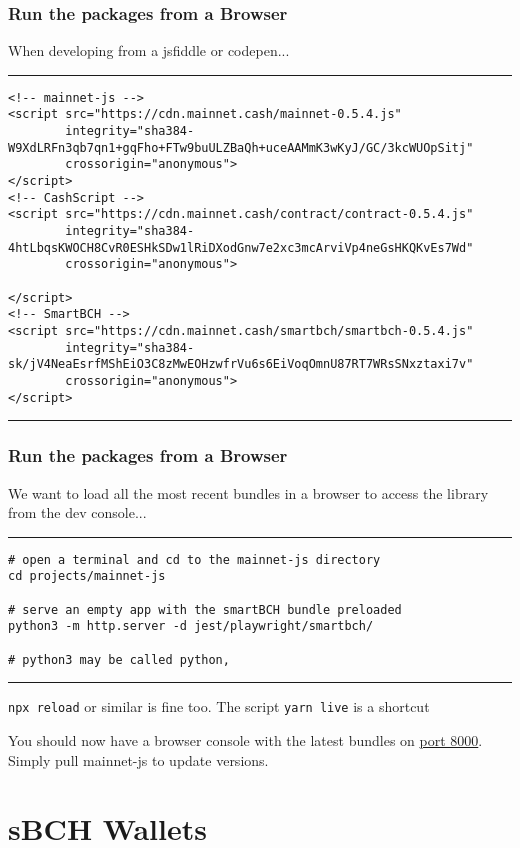\documentclass{beamer}
\begin{document}
\begin{frame}[fragile]
    \frametitle{Run the packages from a Browser}
    When developing from a jsfiddle or codepen...
    \rule{\textwidth}{0.4pt}
    \tiny
    \begin{verbatim}
<!-- mainnet-js -->
<script src="https://cdn.mainnet.cash/mainnet-0.5.4.js"
        integrity="sha384-W9XdLRFn3qb7qn1+gqFho+FTw9buULZBaQh+uceAAMmK3wKyJ/GC/3kcWUOpSitj"
        crossorigin="anonymous">
</script>
<!-- CashScript -->
<script src="https://cdn.mainnet.cash/contract/contract-0.5.4.js"
        integrity="sha384-4htLbqsKWOCH8CvR0ESHkSDw1lRiDXodGnw7e2xc3mcArviVp4neGsHKQKvEs7Wd"
        crossorigin="anonymous">

</script>
<!-- SmartBCH -->
<script src="https://cdn.mainnet.cash/smartbch/smartbch-0.5.4.js"
        integrity="sha384-sk/jV4NeaEsrfMShEiO3C8zMwEOHzwfrVu6s6EiVoqOmnU87RT7WRsSNxztaxi7v"
        crossorigin="anonymous">
</script>
    \end{verbatim}
\rule{\textwidth}{0.4pt}
\end{frame}


\begin{frame}[fragile]
    \frametitle{Run the packages from a Browser}
We want to load all the most recent bundles in a browser to access the library from the dev console...
    \rule{\textwidth}{0.4pt}
    \tiny
    \begin{verbatim}
# open a terminal and cd to the mainnet-js directory
cd projects/mainnet-js

# serve an empty app with the smartBCH bundle preloaded
python3 -m http.server -d jest/playwright/smartbch/

# python3 may be called python, 

    \end{verbatim}
\rule{\textwidth}{0.4pt}

\texttt{npx reload} or similar is fine too. The script \texttt{yarn live}  is a shortcut

You should now have a browser console with the latest bundles on \href{http://127.0.0.1:8000}{port 8000}. 
\\ Simply pull mainnet-js to update versions.
\end{frame}


\section{sBCH Wallets}
\end{document}
